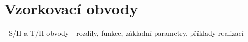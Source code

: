 \section{Vzorkovací obvody}
- S/H a T/H obvody - rozdíly, funkce, základní parametry, příklady realizací